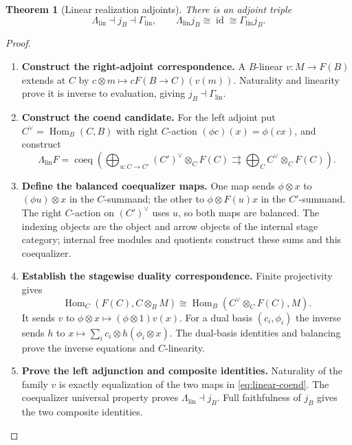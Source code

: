 \documentclass[11pt,a4paper]{article}
\numberwithin{algorithm}{section}
\numberwithin{equation}{section}
\newtheorem{theorem}{Theorem}[section]
\theoremstyle{definition}
\theoremstyle{remark}
\theoremstyle{plain}
\newcommand{\id}{\operatorname{id}}
\newcommand{\Hom}{\operatorname{Hom}}
\newcommand{\coeq}{\operatorname{coeq}}
\newcommand{\Lamlin}{\Lambda_{\mathrm{lin}}}
\newcommand{\Gamlin}{\Gamma_{\mathrm{lin}}}
\theoremstyle{definition}
\theoremstyle{plain}
\begin{document}
\begin{theorem}[Linear realization adjoints]\label{thm:linear-adjoints}
There is an adjoint triple
\[
 \Lamlin\dashv j_B\dashv\Gamlin,\qquad
 \Lamlin j_B\cong\id\cong\Gamlin j_B.
\]
\end{theorem}
\begin{proof}\leavevmode
\begin{enumerate}[leftmargin=*,align=left]
\item \textbf{Construct the right-adjoint correspondence.}
A $B$-linear $v:M\to F(B)$ extends at $C$ by
$c\otimes m\mapsto cF(B\to C)(v(m))$.
Naturality and linearity prove it is inverse to evaluation,
giving $j_B\dashv\Gamlin$.

\item \textbf{Construct the coend candidate.}
For the left adjoint put $C^\vee=\Hom_B(C,B)$ with
right $C$-action $(\phi c)(x)=\phi(cx)$, and construct
\begin{equation}\label{eq:linear-coend}
 \Lamlin F=
 \coeq\left(
 \bigoplus_{u:C\to C'}(C')^\vee\otimes_C F(C)
 \rightrightarrows
 \bigoplus_C C^\vee\otimes_C F(C)\right).
\end{equation}

\item \textbf{Define the balanced coequalizer maps.}
One map sends $\phi\otimes x$ to $(\phi u)\otimes x$
in the $C$-summand; the other to $\phi\otimes F(u)x$
in the $C'$-summand. The right $C$-action on $(C')^\vee$
uses $u$, so both maps are balanced. The indexing objects
are the object and arrow objects of the internal stage
category; internal free modules and quotients construct
these sums and this coequalizer.

\item \textbf{Establish the stagewise duality correspondence.}
Finite projectivity gives
\[
 \Hom_C(F(C),C\otimes_BM)
 \cong
 \Hom_B(C^\vee\otimes_CF(C),M).
\]
It sends $v$ to
$\phi\otimes x\mapsto(\phi\otimes1)v(x)$.
For a dual basis $(c_i,\phi_i)$ the inverse sends $h$
to $x\mapsto\sum_i c_i\otimes h(\phi_i\otimes x)$.
The dual-basis identities and balancing prove the inverse
equations and $C$-linearity.

\item \textbf{Prove the left adjunction and composite identities.}
Naturality of the family $v$ is exactly equalization of
the two maps in \eqref{eq:linear-coend}.
The coequalizer universal property proves
$\Lamlin\dashv j_B$. Full faithfulness of $j_B$ gives
the two composite identities.
\end{enumerate}
\end{proof}
\end{document}
